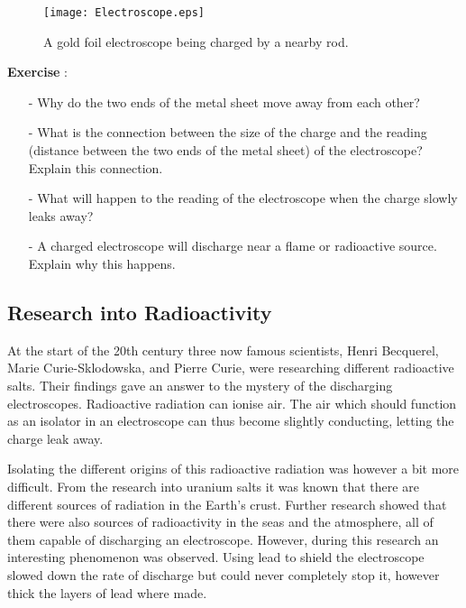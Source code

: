 \begin{figure}\begin{center}
\texttt{[image: Electroscope.eps]}
\caption{A gold foil electroscope being charged by a nearby rod.\protect\footnotemark}\label{fig:electroscope}
\end{center}\end{figure}

\begin{shaded}
\textbf{Exercise \theExercise {}} :
\begin{itemize}
\item[-] Why do the two ends of the metal sheet move away from each other?
\item[-] What is the connection between the size of the charge and the reading (distance between the two ends of the metal sheet) of the electroscope? Explain this connection.
\item[-] What will happen to the reading of the electroscope when the charge slowly leaks away?
\item[-] A charged electroscope will discharge near a flame or radioactive source. Explain why this happens.
\end{itemize}\end{shaded}

\subsection{Research into Radioactivity}
At the start of the 20th century three now famous scientists, Henri Becquerel, Marie Curie-Sklodowska, and Pierre Curie, were researching different radioactive salts. Their findings gave an answer to the mystery of the discharging electroscopes. Radioactive radiation can ionise air. The air which should function as an isolator in an electroscope can thus become slightly conducting, letting the charge leak away.

Isolating the different origins of this radioactive radiation was however a bit more difficult. From the research into uranium salts it was known that there are different sources of radiation in the Earth's crust. Further research showed that there were also sources of radioactivity in the seas and the atmosphere, all of them capable of discharging an electroscope. However, during this research an interesting phenomenon was observed. Using lead to shield the electroscope slowed down the rate of discharge but could never completely stop it, however thick the layers of lead where made.

